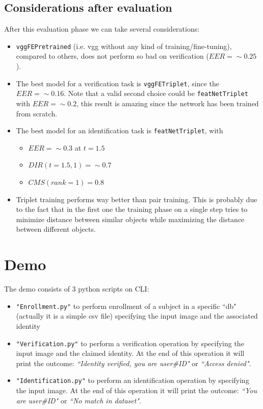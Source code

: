 \documentclass{article}
\begin{document}
\subsection{Considerations after evaluation}
After this evaluation phase we can take several considerations:
\begin{itemize}
    \item \texttt{vggFEPretrained} (i.e. vgg without any kind of training/fine-tuning), compared to others, does not perform so bad on verification ($EER = {\sim} 0.25$).
    \item The best model for a verification task is \texttt{vggFETriplet}, since the $EER={\sim}0.16$. Note that a valid second choice could be \texttt{featNetTriplet} with $EER={\sim}0.2$, this result is amazing since the network has been trained from scratch.
    \item The best model for an identification task is \texttt{featNetTriplet}, with 
    \begin{itemize}
        \item $EER={\sim}0.3$ at $t=1.5$
        \item $DIR(t=1.5, 1)={\sim}0.7$ 
        \item $CMS(rank=1)=0.8$
    \end{itemize}
    \item Triplet training performs way better than pair training. This is probably due to the fact that in the first one the training phase on a single step tries to minimize distance between similar objects while maximizing the distance between different objects.
\end{itemize}

\section{Demo}
The demo consists of 3 python scripts on CLI:
\begin{itemize}
    \item \texttt{"Enrollment.py"} to perform enrollment of a subject in a specific ``db" (actually it is a simple csv file) specifying the input image and the associated identity
    \item \texttt{"Verification.py"} to perform a verification operation by specifying the input image and the claimed identity. At the end of this operation it will print the outcome: \textit{``Identity verified, you are user\#ID"} or \textit{``Access denied"}.
    \item \texttt{"Identification.py"} to perform an identification operation by specifying the input image. At the end of this operation it will print the outcome: \textit{``You are user\#ID"} or \textit{``No match in dataset"}.
\end{itemize}
\end{document}
